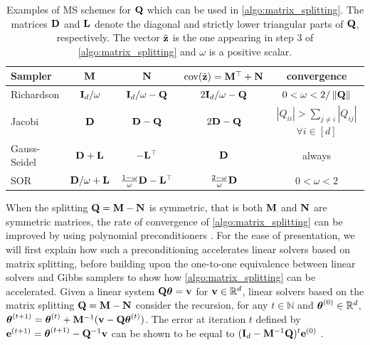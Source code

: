 \documentclass[nohypdvips,onefignum,onetabnum]{siamart171218}
\begin{document}
\begin{table}
{\footnotesize
  \caption{Examples of MS schemes for $\mathbf{Q}$ which can be used in \cref{algo:matrix_splitting}. The matrices $\mathbf{D}$ and $\mathbf{L}$ denote the diagonal and strictly lower triangular parts of $\mathbf{Q}$, respectively. The vector $\tilde{\mathbf{z}}$ is the one appearing in step 3 of \cref{algo:matrix_splitting} and $\omega$ is a positive scalar.}
  \label{table:matrix_splitting}
  \begin{center}
  {\renewcommand{\arraystretch}{1.5}
    \begin{tabular}{|l|c|c|c|c|} 
      \hline
      \textbf{Sampler} & $\mathbf{M}$ & $\mathbf{N}$ & $\mathrm{cov}(\tilde{\mathbf{z}}) = \mathbf{M}^{\top} + \mathbf{N}$ & convergence\\
      \hline 
      Richardson & $\mathbf{I}_d/\omega$ & $\mathbf{I}_d/\omega - \mathbf{Q}$ & $2\mathbf{I}_d/\omega - \mathbf{Q}$ & $0 < \omega < 2/\left\|\mathbf{Q}\right\|$\\ 
      Jacobi & $\mathbf{D}$ & $\mathbf{D} - \mathbf{Q}$ & $2\mathbf{D} - \mathbf{Q}$ & $|Q_{ii}| > \sum_{j\neq i}|Q_{ij}|$ $\forall i \in [d]$\\
      Gauss-Seidel & $\mathbf{D} + \mathbf{L}$ & $-\mathbf{L}^{\top}$ & $\mathbf{D}$ & always\\
      SOR & $\mathbf{D}/\omega + \mathbf{L}$ & $\frac{1-\omega}{\omega}\mathbf{D} - \mathbf{L}^{\top}$ & $\frac{2-\omega}{\omega}\mathbf{D}$ & $0 < \omega < 2$\\[1em]
      \hline
    \end{tabular}}
  \end{center}
}
\end{table}
When the splitting $\mathbf{Q}=\mathbf{M}-\mathbf{N}$ is symmetric, that is both $\mathbf{M}$ and $\mathbf{N}$ are symmetric matrices, the rate of convergence of \cref{algo:matrix_splitting} can be improved by using polynomial preconditioners \cite{Fox2017}.
For the ease of presentation, we will first explain how such a preconditioning accelerates linear solvers based on matrix splitting, before building upon the one-to-one equivalence between linear solvers and Gibbs samplers to show how \cref{algo:matrix_splitting} can be accelerated.
Given a linear system $\mathbf{Q}\boldsymbol{\theta} = \mathbf{v}$ for $\mathbf{v} \in \mathbb{R}^d$, linear solvers based on the matrix splitting $\mathbf{Q} = \mathbf{M}-\mathbf{N}$ consider the recursion, for any $t \in \mathbb{N}$ and $\boldsymbol{\theta}^{(0)} \in \mathbb{R}^d$, $\boldsymbol{\theta}^{(t+1)} = \boldsymbol{\theta}^{(t)} +  \mathbf{M}^{-1}(\mathbf{v}-\mathbf{Q}\boldsymbol{\theta}^{(t)})$.
The error at iteration $t$ defined by $\mathbf{e}^{(t+1)} = \boldsymbol{\theta}^{(t+1)} - \mathbf{Q}^{-1}\mathbf{v}$ can be shown to be equal to $(\mathbf{I}_d-\mathbf{M}^{-1}\mathbf{Q})^t\mathbf{e}^{(0)}$ \cite{Golub1989}.
\end{document}

